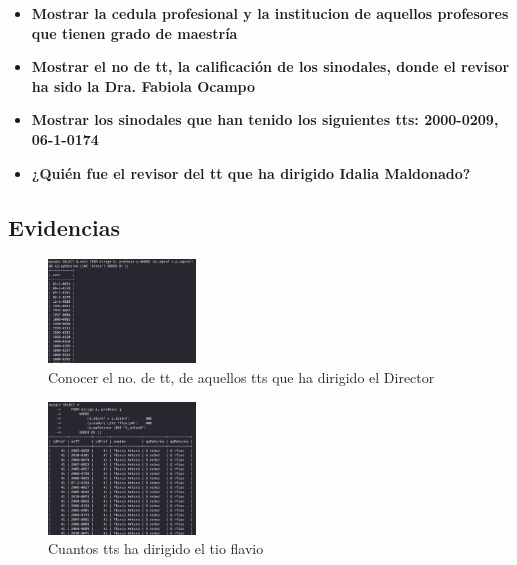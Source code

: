 \documentclass[12pt, fleqn]{article}                             %
\begin{document}
\begin{itemize}
        \item
            \textbf{Mostrar la cedula profesional y la institucion de aquellos profesores que
            tienen grado de maestría}
            

        \clearpage

        \item
            \textbf{Mostrar el no de tt, la calificación de los sinodales, donde el revisor ha
            sido la Dra. Fabiola Ocampo}
            


        \item
            \textbf{Mostrar los sinodales que han tenido los siguientes tts: 2000-0209, 06-1-0174}
            

        \item
            \textbf{¿Quién fue el revisor del tt que ha dirigido Idalia Maldonado?}
            

    \end{itemize}


    \clearpage
    \subsection{Evidencias}

        \begin{figure}[ht!]
            \centering
            \includegraphics[width=0.35\textwidth]{BD4Reporte1}
            \caption{Conocer el no. de tt, de aquellos tts que ha dirigido el Director}
        \end{figure}

        \begin{figure}[ht!]
            \centering
            \includegraphics[width=0.35\textwidth]{BD4Reporte2}
            \caption{Cuantos tts ha dirigido el tio flavio}
        \end{figure}
\end{document}
